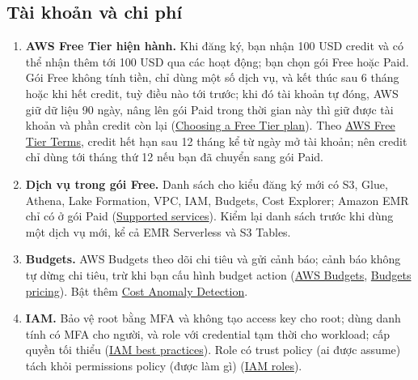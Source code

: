 \subsection{Tài khoản và chi phí}
\begin{enumerate}
  \item \textbf{AWS Free Tier hiện hành.} Khi đăng ký, bạn nhận 100 USD credit và có thể nhận thêm tới 100 USD qua các hoạt động; bạn chọn gói Free hoặc Paid. Gói Free không tính tiền, chỉ dùng một số dịch vụ, và kết thúc sau 6 tháng hoặc khi hết credit, tuỳ điều nào tới trước; khi đó tài khoản tự đóng, AWS giữ dữ liệu 90 ngày, nâng lên gói Paid trong thời gian này thì giữ được tài khoản và phần credit còn lại (\href{https://docs.aws.amazon.com/awsaccountbilling/latest/aboutv2/free-tier-plans.html}{Choosing a Free Tier plan}). Theo \href{https://aws.amazon.com/free/terms}{AWS Free Tier Terms}, credit hết hạn sau 12 tháng kể từ ngày mở tài khoản; nên credit chỉ dùng tới tháng thứ 12 nếu bạn đã chuyển sang gói Paid.
  \item \textbf{Dịch vụ trong gói Free.} Danh sách cho kiểu đăng ký mới có S3, Glue, Athena, Lake Formation, VPC, IAM, Budgets, Cost Explorer; Amazon EMR chỉ có ở gói Paid (\href{https://docs.aws.amazon.com/accounts/latest/reference/supported-services-sign-up-new.md}{Supported services}). Kiểm lại danh sách trước khi dùng một dịch vụ mới, kể cả EMR Serverless và S3 Tables.
  \item \textbf{Budgets.} AWS Budgets theo dõi chi tiêu và gửi cảnh báo; cảnh báo không tự dừng chi tiêu, trừ khi bạn cấu hình budget action (\href{https://docs.aws.amazon.com/cost-management/latest/userguide/budgets-managing-costs.html}{AWS Budgets}, \href{https://aws.amazon.com/aws-cost-management/aws-budgets/pricing/}{Budgets pricing}). Bật thêm \href{https://docs.aws.amazon.com/cost-management/latest/userguide/getting-started-ad.html}{Cost Anomaly Detection}.
  \item \textbf{IAM.} Bảo vệ root bằng MFA và không tạo access key cho root; dùng danh tính có MFA cho người, và role với credential tạm thời cho workload; cấp quyền tối thiểu (\href{https://docs.aws.amazon.com/IAM/latest/UserGuide/best-practices.html}{IAM best practices}). Role có trust policy (ai được assume) tách khỏi permissions policy (được làm gì) (\href{https://docs.aws.amazon.com/IAM/latest/UserGuide/id_roles.html}{IAM roles}).
\end{enumerate}

